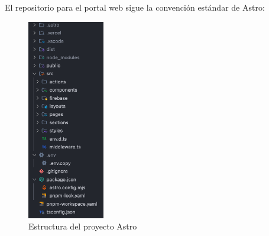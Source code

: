 \begin{large}

El repositorio para el portal web sigue la convención estándar de Astro:

\begin{figure}[H]
\centering
\includegraphics[width=0.3\textwidth]{Ilustraciones/astro_project_structure.png}
\caption{Estructura del proyecto Astro}
\label{fig:astro_project_structure}
\end{figure}


\end{large}
